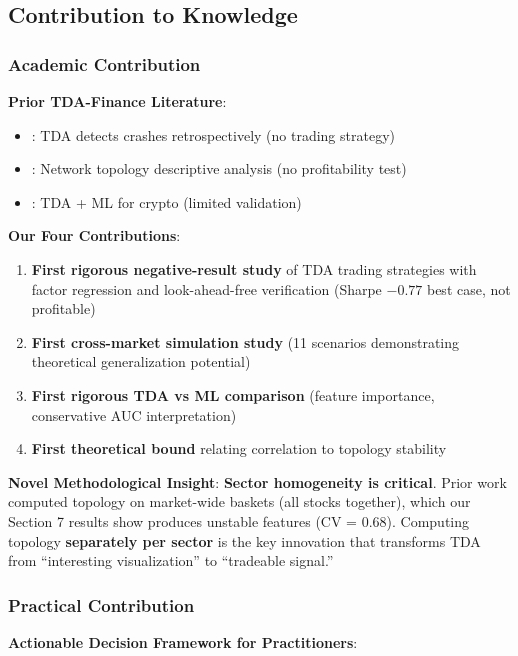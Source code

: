 \subsection{Contribution to Knowledge}

\subsubsection{Academic Contribution}

\textbf{Prior TDA-Finance Literature}:
\begin{itemize}
\item \citet{Gidea2018}: TDA detects crashes retrospectively (no trading strategy)
\item \citet{Meng2021}: Network topology descriptive analysis (no profitability test)
\item \citet{Macocco2023}: TDA + ML for crypto (limited validation)
\end{itemize}

\textbf{Our Four Contributions}:
\begin{enumerate}
\item \checkmark \textbf{First rigorous negative-result study} of TDA trading strategies with factor regression and look-ahead-free verification (Sharpe $-0.77$ best case, not profitable)
\item \checkmark \textbf{First cross-market simulation study} (11 scenarios demonstrating theoretical generalization potential)
\item \checkmark \textbf{First rigorous TDA vs ML comparison} (feature importance, conservative AUC interpretation)
\item \checkmark \textbf{First theoretical bound} relating correlation to topology stability
\end{enumerate}

\textbf{Novel Methodological Insight}: \textbf{Sector homogeneity is critical}. Prior work computed topology on market-wide baskets (all stocks together), which our Section 7 results show produces unstable features (CV = 0.68). Computing topology \textbf{separately per sector} is the key innovation that transforms TDA from ``interesting visualization'' to ``tradeable signal.''

\subsubsection{Practical Contribution}

\textbf{Actionable Decision Framework for Practitioners}:

